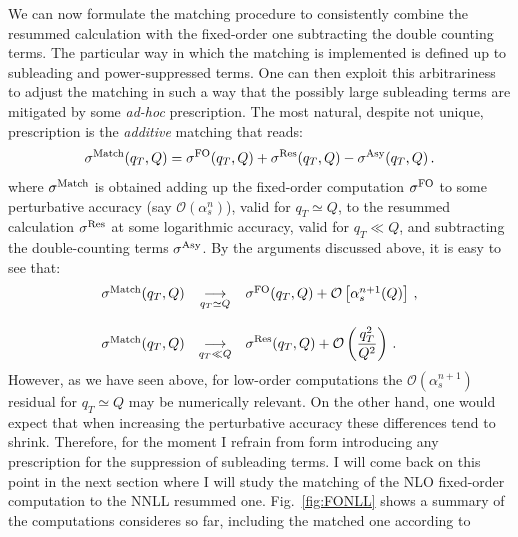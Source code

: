 \documentclass[10pt,a4paper]{article}
\begin{document}
We can now formulate the matching procedure to consistently combine
the resummed calculation with the fixed-order one subtracting the
double counting terms. The particular way in which the matching is
implemented is defined up to subleading and power-suppressed
terms. One can then exploit this arbitrariness to adjust the matching
in such a way that the possibly large subleading terms are mitigated
by some \textit{ad-hoc} prescription. The most natural, despite not
unique, prescription is the \textit{additive} matching that reads:
\begin{equation}\label{eq:matching1}
\sigma^{\rm Match}(q_T,Q) = \sigma^{\rm FO}(q_T,Q) + \sigma^{\rm Res}(q_T,Q) - \sigma^{\rm Asy}(q_T,Q)\,.
\end{equation}
where $\sigma^{\rm Match}$ is obtained adding up the fixed-order
computation $\sigma^{\rm FO}$ to some perturbative accuracy (say
$\mathcal{O}(\alpha_s^n)$), valid for $q_T \simeq Q$, to the resummed
calculation $\sigma^{\rm Res}$ at some logarithmic accuracy, valid for
$q_T\ll Q$, and subtracting the double-counting terms
$\sigma^{\rm Asy}$. By the arguments discussed above, it is easy to
see that:
\begin{equation}
\begin{array}{rcl}
  \sigma^{\rm Match}(q_T,Q) &\displaystyle\mathop{\longrightarrow}_{q_T\simeq Q}&
                                                                                  \sigma^{\rm FO}(q_T,Q) +\mathcal{O}\left[\alpha_s^{n+1}(Q)\right]\,,\\
  \\
  \sigma^{\rm Match}(q_T,Q) &\displaystyle\mathop{\longrightarrow}_{q_T\ll Q}&\displaystyle
                                                                               \sigma^{\rm Res}(q_T,Q) +\mathcal{O}\left(\frac{q_T^2}{Q^2}\right)\,.
\end{array}
\end{equation}
However, as we have seen above, for low-order computations the
$\mathcal{O}(\alpha_s^{n+1})$ residual for $q_T\simeq Q$ may be
numerically relevant. On the other hand, one would expect that when
increasing the perturbative accuracy these differences tend to
shrink. Therefore, for the moment I refrain from form introducing any
prescription for the suppression of subleading terms. I will come back
on this point in the next section where I will study the matching of
the NLO fixed-order computation to the NNLL resummed
one. Fig.~\ref{fig:FONLL} shows a summary of the computations
consideres so far, including the matched one according to
\end{document}
